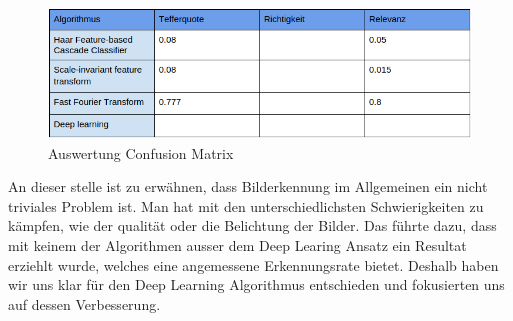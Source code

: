 \begin{figure}[ht]
\includegraphics[width=\textwidth]{images/auserwertung_conf.png}
\caption[Auswertung Confusion Matrix]{Auswertung Confusion Matrix}
\end{figure}

An dieser stelle ist zu erwähnen, dass Bilderkennung im Allgemeinen ein nicht triviales Problem ist. Man hat mit den unterschiedlichsten Schwierigkeiten zu kämpfen, wie der qualität oder die Belichtung der Bilder. Das führte dazu, dass
mit keinem der Algorithmen ausser dem Deep Learing Ansatz ein Resultat erziehlt wurde, welches eine angemessene Erkennungsrate bietet. Deshalb haben wir uns klar für den Deep Learning Algorithmus entschieden und fokusierten uns auf dessen Verbesserung.  



